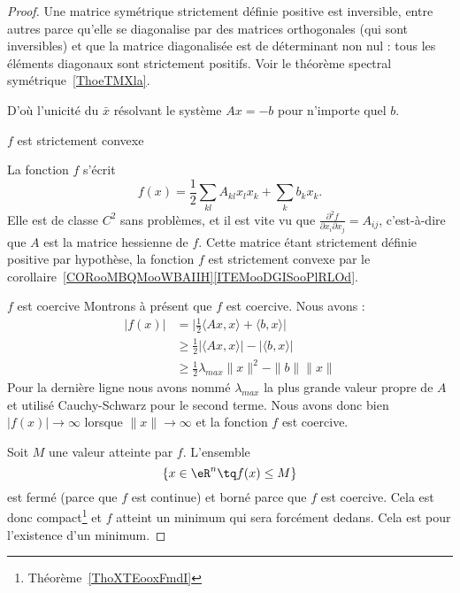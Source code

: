 \begin{proof}

    Une matrice symétrique strictement définie positive est inversible, entre autres parce qu'elle se diagonalise par des matrices orthogonales (qui sont inversibles) et que la matrice diagonalisée est de déterminant non nul : tous les éléments diagonaux sont strictement positifs. Voir le théorème spectral symétrique~\ref{ThoeTMXla}.

    D'où l'unicité du \( \bar x\) résolvant le système \( Ax=-b\) pour n'importe quel \( b\).

    \begin{subproof}
    \item[\( f\) est strictement convexe]

        La fonction \( f\) s'écrit
    \begin{equation}
        f(x)=\frac{ 1 }{2}\sum_{kl}A_{kl}x_lx_k+\sum_kb_kx_k.
    \end{equation}
    Elle est de classe \( C^2\) sans problèmes, et il est vite vu que \( \frac{ \partial^2f }{ \partial x_i\partial x_j }=A_{ij}\), c'est-à-dire que \( A\) est la matrice hessienne de \( f\). Cette matrice étant strictement définie positive par hypothèse, la fonction \( f\) est strictement convexe par le corollaire~\ref{CORooMBQMooWBAIIH}\ref{ITEMooDGISooPlRLOd}.

\item[\( f\) est coercive]
    Montrons à présent que \( f\) est coercive. Nous avons :
    \begin{subequations}
        \begin{align}
            | f(x) |&=\big| \frac{ 1 }{2}\langle Ax, x\rangle +\langle b, x\rangle  \big|\\
            &\geq\frac{ 1 }{2}| \langle Ax, x\rangle  |-| \langle b, x\rangle  |\\
            &\geq\frac{ 1 }{2}\lambda_{max}\| x \|^2-\| b \|\| x \|
        \end{align}
    \end{subequations}
    Pour la dernière ligne nous avons nommé \( \lambda_{max}\) la plus grande valeur propre de \( A\) et utilisé Cauchy-Schwarz pour le second terme. Nous avons donc bien \( | f(x) |\to \infty\) lorsque \( \| x \|\to\infty\) et la fonction \( f\) est coercive.
    \end{subproof}

    Soit \( M\) une valeur atteinte par \( f\). L'ensemble
    \begin{equation}
        \{ x\in \eR^n\tq f(x)\leq M \}
    \end{equation}
    est fermé (parce que \( f\) est continue) et borné parce que \( f\) est coercive. Cela est donc compact\footnote{Théorème~\ref{ThoXTEooxFmdI}} et \( f\) atteint un minimum qui sera forcément dedans. Cela est pour l'existence d'un minimum.


\end{proof}
